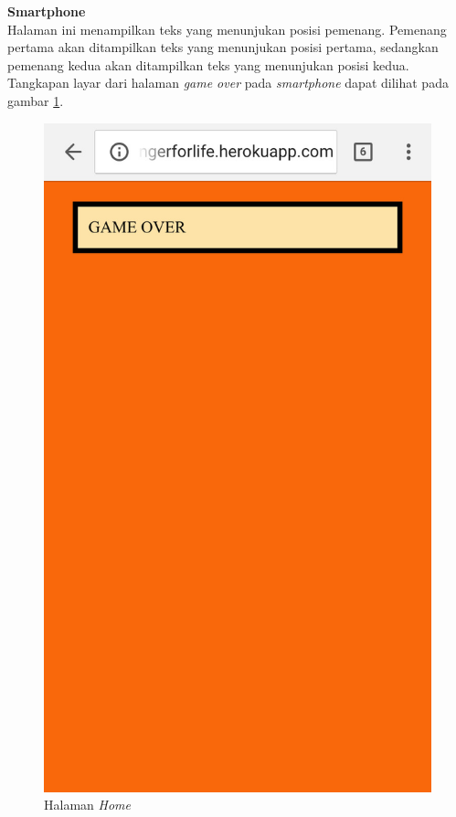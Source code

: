 \begin{enumerate}
	\textbf{Smartphone} \\
	Halaman ini menampilkan teks yang menunjukan posisi pemenang. Pemenang pertama akan ditampilkan teks yang menunjukan posisi pertama, sedangkan pemenang kedua akan ditampilkan teks yang menunjukan posisi kedua. Tangkapan layar dari halaman \textit{game over} pada \textit{smartphone} dapat dilihat pada gambar \ref{fig:realPhone5_over}.
	\begin{figure}[H]
		\centering
		\includegraphics[scale=0.2]{Gambar/realPhone5_over}
		\caption{Halaman \textit{Home}}
		\label{fig:realPhone5_over}
	\end{figure}

\end{enumerate}


